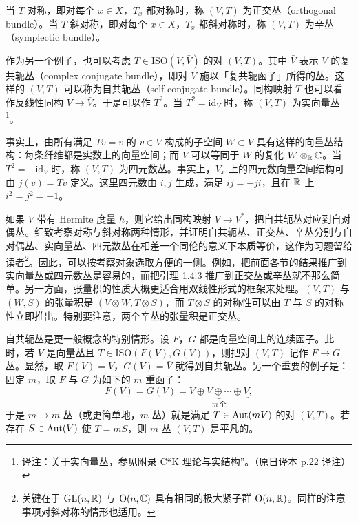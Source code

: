 当 $T$ 对称，即对每个 $x\in X$，$T_x$ 都对称时，称 $(V,T)$ 为正交丛（orthogonal bundle）。当 $T$ 斜对称，即对每个 $x\in X$，$T_x$ 都斜对称时，称 $(V,T)$ 为辛丛（symplectic bundle）。

作为另一个例子，也可以考虑 $T\in\mathrm{ISO}(V,\bar V)$ 的对 $(V,T)$。其中 $\bar V$ 表示 $V$ 的复共轭丛（complex conjugate bundle），即对 $V$ 施以「复共轭函子」所得的丛。这样的 $(V,T)$ 可以称为自共轭丛（self-conjugate bundle）。同构映射 $T$ 也可以看作反线性同构 $V\to\bar V$。于是可以作 $T^2$。当 $T^2=\mathrm{id}_V$ 时，称 $(V,T)$ 为实向量丛\footnote{译注：关于实向量丛，参见附录 C“K 理论与实结构”。（原日译本 p.22 译注）}。

事实上，由所有满足 $Tv=v$ 的 $v\in V$ 构成的子空间 $W\subset V$ 具有这样的向量丛结构：每条纤维都是实数上的向量空间；而 $V$ 可以等同于 $W$ 的复化 $W\otimes_{\mathbb{R}}\mathbb{C}$。当 $T^2=-\mathrm{id}_V$ 时，称 $(V,T)$ 为四元数丛。事实上，$V_x$ 上的四元数向量空间结构可由 $j(v)=Tv$ 定义。这里四元数由 $i,j$ 生成，满足 $ij=-ji$，且在 $\mathbb{R}$ 上 $i^2=j^2=-1$。

如果 $V$ 带有 Hermite 度量 $h$，则它给出同构映射 $\bar V\to V^{*}$，把自共轭丛对应到自对偶丛。细致考察对称与斜对称两种情形，并证明自共轭丛、正交丛、辛丛分别与自对偶丛、实向量丛、四元数丛在相差一个同伦的意义下本质等价，这作为习题留给读者\footnote{关键在于 $\mathrm{GL}(n,\mathbb{R})$ 与 $\mathrm{O}(n,\mathbb{C})$ 具有相同的极大紧子群 $\mathrm{O}(n,\mathbb{R})$。同样的注意事项对斜对称的情形也适用。}。因此，可以按考察对象选取方便的一侧。例如，把前面各节的结果推广到实向量丛或四元数丛是容易的，而把引理 1.4.3 推广到正交丛或辛丛就不那么简单。另一方面，张量积的性质大概更适合用双线性形式的框架来处理。$(V,T)$ 与 $(W,S)$ 的张量积是 $(V\otimes W,T\otimes S)$，而 $T\otimes S$ 的对称性可以由 $T$ 与 $S$ 的对称性立即推出。特别要注意，两个辛丛的张量积是正交丛。

自共轭丛是更一般概念的特别情形。设 $F$，$G$ 都是向量空间上的连续函子。此时，若 $V$ 是向量丛且 $T\in\mathrm{ISO}(F(V),G(V))$，则把对 $(V,T)$ 记作 $F\to G$ 丛。显然，取 $F(V)=V$，$G(V)=\bar V$ 就得到自共轭丛。另一个重要的例子是：固定 $m$，取 $F$ 与 $G$ 为如下的 $m$ 重函子：
\[
F(V)=G(V)=\underbrace{V\oplus V\oplus\cdots\oplus V}_{m\ \text{个}},
\]
于是 $m\to m$ 丛（或更简单地，$m$ 丛）就是满足 $T\in\operatorname{Aut}(mV)$ 的对 $(V,T)$。若存在 $S\in\operatorname{Aut}(V)$ 使 $T=mS$，则 $m$ 丛 $(V,T)$ 是平凡的。

